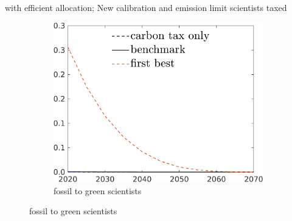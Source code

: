 \documentclass[11pt,aspectratio=169]{beamer}
\begin{document}
\begin{frame}{with efficient allocation; New calibration and emission limit scientists taxed}
\begin{figure}[h!!]
\begin{subfigure}{0.3\textwidth}
		\end{subfigure}
	\begin{subfigure}{0.3\textwidth}		
	\caption{{fossil to green scientists}}
	\includegraphics[width=1\textwidth]{../codding_model/own_basedOnFried/optimalPol_010922_revision/figures/all_13Sept22/NewCalib_eff2pol_T_sffsg_Sun2_emnet1_spillover0_knspil3_xgr0_nsk0_sep0_extern0_PV1_etaa0.79_lgd1.png}
\end{subfigure}
	\end{figure}
\end{frame}
\end{document}
